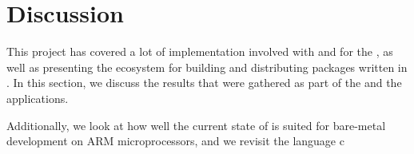 
\chapter{Discussion}
\label{chap:discussion}

This project has covered a lot of implementation involved with {\rust} and {\C} for the {\gecko}, as well as presenting the ecosystem for building and distributing packages written in {\rust}.
In this section, we discuss the results that were gathered as part of the {\tracker} and the {\cg} applications.

Additionally, we look at how well the current state of {\rust} is suited for bare-metal development on ARM microprocessors, and we revisit the language c





